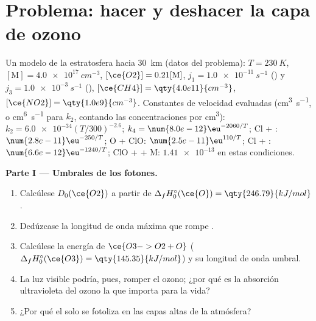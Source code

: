 \section{Problema: hacer y deshacer la capa de ozono}

\begin{problem}
\label{pb:b3:photochemistry:1}
Un modelo de la estratosfera hacia \qty{30}{km} (datos del problema): $T = \qty{230}{K}$, $[\mathrm M] =
\qty{4.0e17}{cm^{-3}}$, $[\ce{O2}] = 0.21[\mathrm M]$,  $j_1 = \qty{1.0e-11}{s^{-1}}$ ()
y $j_3 = \qty{1.0e-3}{s^{-1}}$ (), $[\ce{CH4}] = \qty{4.0e11}{cm^{-3}}$, $[\ce{NO2}] = \qty{1.0e9}{cm^{-3}}$. Constantes de velocidad
evaluadas (\unit{cm^3.s^{-1}}, o \unit{cm^6.s^{-1}} para $k_2$, contando las concentraciones por \unit{cm^3}):
$k_2 = \num{6.0e-34}(T/300)^{-2.6}$; $k_4 = \num{8.0e-12}\eu^{-2060/T}$; Cl + : $\num{2.8e-11}\eu^{-250/T}$;
O + ClO: $\num{2.5e-11}\eu^{110/T}$; Cl + : $\num{6.6e-12}\eu^{-1240/T}$; ClO +  + M: $\num{1.41e-13}$ en
estas condiciones.

\medskip\noindent\textbf{Parte I --- Umbrales de los fotones.}
\begin{enumerate}
  \item Calcúlese $D_0(\ce{O2})$ a partir de $\Delta_fH^\circ_0(\ce{O}) = \qty{246.79}{kJ/mol}$.
  \item Dedúzcase la longitud de onda máxima que rompe .
  \item Calcúlese la energía de $\ce{O3 -> O2 + O}$ ($\Delta_fH^\circ_0(\ce{O3}) = \qty{145.35}{kJ/mol}$) y su
        longitud de onda umbral.
  \item La luz visible podría, pues, romper el ozono; ¿por qué es la absorción ultravioleta
        del ozono la que importa para la vida?
  \item ¿Por qué el  solo se fotoliza en las capas altas de la atmósfera?
\end{enumerate}


\end{problem}
